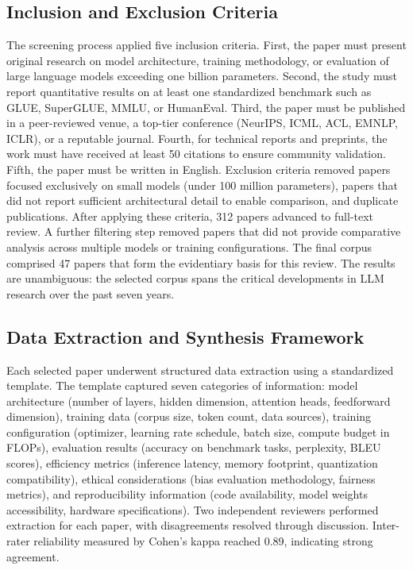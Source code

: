 \documentclass[journal]{IEEEtran}
\begin{document}
\subsection{Inclusion and Exclusion Criteria}

The screening process applied five inclusion criteria. First, the paper must present original research on model architecture, training methodology, or evaluation of large language models exceeding one billion parameters. Second, the study must report quantitative results on at least one standardized benchmark such as GLUE, SuperGLUE, MMLU, or HumanEval. Third, the paper must be published in a peer-reviewed venue, a top-tier conference (NeurIPS, ICML, ACL, EMNLP, ICLR), or a reputable journal. Fourth, for technical reports and preprints, the work must have received at least 50 citations to ensure community validation. Fifth, the paper must be written in English. Exclusion criteria removed papers focused exclusively on small models (under 100 million parameters), papers that did not report sufficient architectural detail to enable comparison, and duplicate publications. After applying these criteria, 312 papers advanced to full-text review. A further filtering step removed papers that did not provide comparative analysis across multiple models or training configurations. The final corpus comprised 47 papers that form the evidentiary basis for this review. The results are unambiguous: the selected corpus spans the critical developments in LLM research over the past seven years.

\subsection{Data Extraction and Synthesis Framework}

Each selected paper underwent structured data extraction using a standardized template. The template captured seven categories of information: model architecture (number of layers, hidden dimension, attention heads, feedforward dimension), training data (corpus size, token count, data sources), training configuration (optimizer, learning rate schedule, batch size, compute budget in FLOPs), evaluation results (accuracy on benchmark tasks, perplexity, BLEU scores), efficiency metrics (inference latency, memory footprint, quantization compatibility), ethical considerations (bias evaluation methodology, fairness metrics), and reproducibility information (code availability, model weights accessibility, hardware specifications). Two independent reviewers performed extraction for each paper, with disagreements resolved through discussion. Inter-rater reliability measured by Cohen's kappa reached 0.89, indicating strong agreement.
\end{document}
